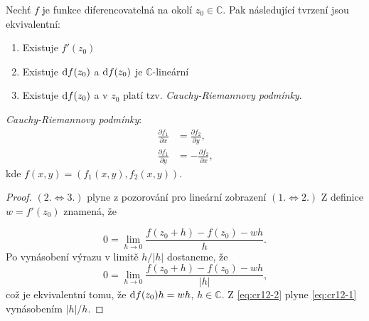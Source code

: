 
\begin{theorem}\label{CR}
Nechť $f$ je funkce diferencovatelná na okolí $z_0 \in \mathbb{C}$. Pak následující tvrzení jsou ekvivalentní:
\begin{enumerate}
    \item Existuje $f'(z_0)$ %
    \item Existuje $\mathop{}\!\mathrm{d} f(z_0)$ a $\mathop{}\!\mathrm{d} f(z_0)$ je $ \mathbb{C}$-lineární %
    \item Existuje $\mathop{}\!\mathrm{d} f(z_0)$ a v $z_0$ platí tzv. \emph{Cauchy-Riemannovy podmínky}. %
\end{enumerate}
\emph{Cauchy-Riemannovy podmínky}:
\begin{align*}
\tag{CR}
\label{eqn:CR}
\frac{\partial f_1}{\partial x} &= \frac{\partial f_2}{\partial y}\text{, }\\
\frac{\partial f_1}{\partial y} &= -\frac{\partial f_2}{\partial x}\text{,}    
\end{align*}
kde $f(x,y) = (f_1(x,y),f_2(x,y))$.

\end{theorem}
\begin{proof}
$(2. \iff 3.)$ plyne z pozorování pro lineární zobrazení %
\newline
$(1. \iff 2.)$ Z definice $w = f'(z_0)$ znamená, že 

\begin{equation}\label{eq:cr12-1} 
0 = \lim_{h \to 0} {\frac{f(z_0+h)-f(z_0)-wh}{h}}\text{.} 
\end{equation}
Po vynásobení výrazu v limitě $h/|h|$ dostaneme, že
\begin{equation}\label{eq:cr12-2}
0 = \lim_{h \to 0} \frac{f(z_0+h)-f(z_0)-wh}{|h|}\text{,}
\end{equation}%
což je ekvivalentní tomu, že  $\mathop{}\!\mathrm{d} f(z_0)h=wh$, $h\in \mathbb{C}$. Z \cref{eq:cr12-2} plyne \cref{eq:cr12-1} vynásobením $|h|/h$.
\end{proof}

